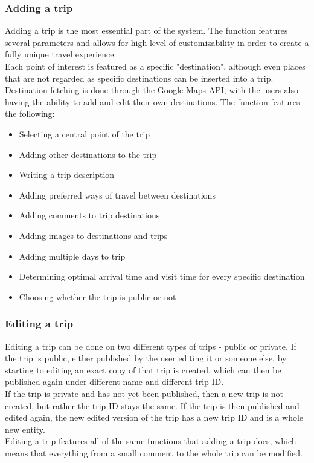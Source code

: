 \subsubsection{Adding a trip}
\hspace{\parindent}Adding a trip is the most essential part of the system. The function features several parameters and allows for high level of customizability in order to create a fully unique travel experience. \\
Each point of interest is featured as a specific "destination", although even places that are not regarded as specific destinations can be inserted into a trip. Destination fetching is done through the Google Maps API, with the users also having the ability to add and edit their own destinations.
The function features the following:
\begin{itemize}
\item Selecting a central point of the trip
\item Adding other destinations to the trip
\item Writing a trip description
\item Adding preferred ways of travel between destinations
\item Adding comments to trip destinations
\item Adding images to destinations and trips
\item Adding multiple days to trip
\item Determining optimal arrival time and visit time for every specific destination
\item Choosing whether the trip is public or not
\end{itemize}
\subsubsection{Editing a trip}
\hspace{\parindent}Editing a trip can be done on two different types of trips - public or private. If the trip is public, either published by the user editing it or someone else, by starting to editing an exact copy of that trip is created, which can then be published again under different name and different trip ID.\\
If the trip is private and has not yet been published, then a new trip is not created, but rather the trip ID stays the same. If the trip is then published and edited again, the new edited version of the trip has a new trip ID and is a whole new entity.\\
Editing a trip features all of the same functions that adding a trip does, which means that everything from a small comment to the whole trip can be modified. 
